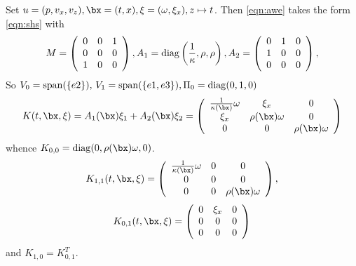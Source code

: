 Set $u=(p,v_x,v_z), \bx=(t,x), \xi=(\omega,\xi_x), z \mapsto t$. Then \ref{eqn:awe} takes the form \ref{eqn:shs} with
\[
  M =
  \left(
    \begin{array}{ccc}
      0 & 0 & 1\\
      0 & 0 & 0\\
      1 & 0 & 0
    \end{array}
  \right),
  A_1 ={\rm diag}\left(\frac{1}{\kappa},\rho,\rho\right),
  A_2 =
 \left(
    \begin{array}{ccc}
      0 & 1 & 0\\
      1 & 0 & 0\\
      0 & 0 & 0
    \end{array}
  \right),
\]
So $V_0={\rm span}(\{e2\}),\, V_1={\rm span}(\{e1,e3\}), \Pi_0 = {\rm diag}(0,1,0)$ 
\[
  K(t,\bx,\xi) =  A_1(\bx) \xi_1 + A_2(\bx) \xi_2 =
  \left(
    \begin{array}{ccc}
      \frac{1}{\kappa(\bx)}\omega & \xi_x & 0 \\
      \xi_x & \rho(\bx) \omega & 0 \\
      0 & 0 & \rho(\bx) \omega
    \end{array}
  \right)
\]
whence $K_{0,0} = {\rm diag}(0, \rho(\bx) \omega, 0)$.
\[
  K_{1,1}(t,\bx,\xi) =
  \left(
    \begin{array}{ccc}
      \frac{1}{\kappa(\bx)}\omega & 0 & 0 \\
      0 & 0 & 0 \\
      0 & 0 & \rho(\bx) \omega
    \end{array}
  \right),
\]
\[
  K_{0,1}(t,\bx,\xi) =
  \left(
    \begin{array}{ccc}
      0 & \xi_x & 0 \\
      0 & 0 & 0 \\
      0 & 0 & 0
    \end{array}
  \right)
\]
and $K_{1,0} = K_{0,1}^T$.
  
